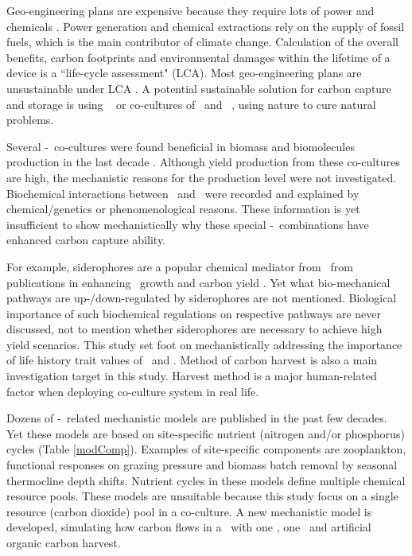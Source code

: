 \documentclass[../thesis.tex]{subfiles} %
\begin{document}
Geo-engineering plans are expensive because they require lots of power and chemicals \autocite{boyd2008ranking,boyd2008implications,mcclellan2012cost}.  Power generation and chemical extractions rely on the supply of fossil fuels, which is the main contributor of climate change.  Calculation of the overall benefits, carbon footprints and environmental damages within the lifetime of a device is a ``life-cycle assessment" (LCA).  Most geo-engineering plans are unsustainable under LCA \autocite{abdussalam2020green}.  A potential sustainable solution for carbon capture and storage is using \phy\ \autocite{farrelly2013carbon} or co-cultures of \phy\ and \bac\ \autocite{fuentes2016impact}, using nature to cure natural problems.

Several \phy-\bac\ co-cultures were found beneficial in biomass and biomolecules production in the last decade \autocite{fuentes2016impact,santos2014microalgal}.  Although yield production from these co-cultures are high, the mechanistic reasons for the production level were not investigated.  Biochemical interactions between \phy\ and \bac\ were recorded and explained by chemical/genetics \autocite{amin2009photolysis,durham2015cryptic,leyva2014accumulation,rivas2010interactions,seyedsayamdost2011roseobacticides} or phenomenological \autocite{choix2012enhanced1,choix2012enhanced2,kazamia2012mutualistic,santos2014microalgal} reasons.  These information is yet insufficient to show mechanistically why these special \phy-\bac\ combinations have enhanced carbon capture ability.

For example, siderophores are a popular chemical mediator from \bac\ from publications in enhancing \phy\ growth and carbon yield \autocite{fuentes2016impact}.  Yet what bio-mechanical pathways are up-/down-regulated by siderophores are not mentioned.  Biological importance of such biochemical regulations on respective pathways are never discussed, not to mention whether siderophores are necessary to achieve high yield scenarios.  This study set foot on mechanistically addressing the importance of life history trait values of \phy\ and \bac.  Method of carbon harvest is also a main investigation target in this study.  Harvest method is a major human-related factor when deploying co-culture system in real life.

Dozens of \phy-\bac\ related mechanistic models are published in the past few decades.  Yet these models are based on site-specific nutrient (nitrogen and/or phosphorus) cycles (Table \ref{modComp}).  Examples of site-specific components are zooplankton, functional responses on grazing pressure and biomass batch removal by seasonal thermocline depth shifts.  Nutrient cycles in these models define multiple chemical resource pools.  These models are unsuitable because this study focus on a single resource (carbon dioxide) pool in a co-culture.  A new mechanistic model is developed, simulating how carbon flows in a \pbs\ with one \phy, one \bac\ and artificial organic carbon harvest.
\end{document}
